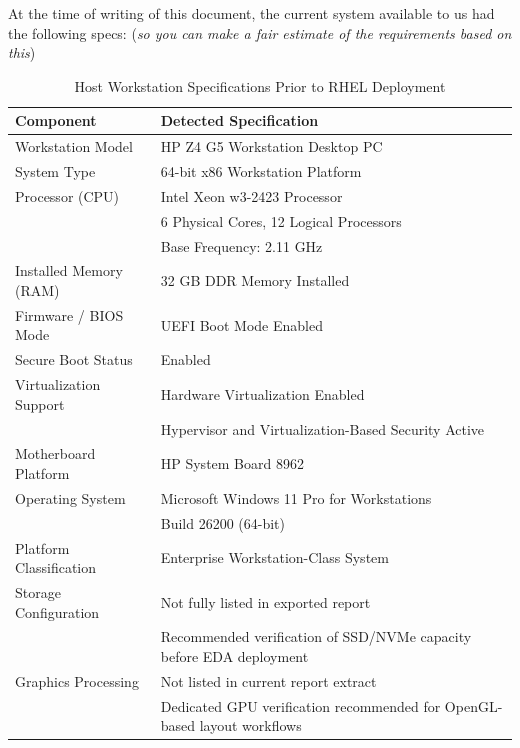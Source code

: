 \noindent At the time of writing of this document, the current system available to us had the following specs: (\textit{so you can make a fair estimate of the requirements based on this})

\begin{table}[H]
	\centering
	\renewcommand{\arraystretch}{1.4}

	\begin{tabular}{|p{5cm}|p{8cm}|}
		\hline
		\textbf{Component} & \textbf{Detected Specification} \\
		\hline
		Workstation Model &
		HP Z4 G5 Workstation Desktop PC \\
		\hline
		System Type &
		64-bit x86 Workstation Platform \\
		\hline
		Processor (CPU) &
		Intel Xeon w3-2423 Processor \\
		&
		6 Physical Cores, 12 Logical Processors \\
		&
		Base Frequency: 2.11 GHz \\
		\hline
		Installed Memory (RAM) &
		32 GB DDR Memory Installed \\
		\hline
		Firmware / BIOS Mode &
		UEFI Boot Mode Enabled \\
		\hline
		Secure Boot Status &
		Enabled \\
		\hline
		Virtualization Support &
		Hardware Virtualization Enabled \\
		&
		Hypervisor and Virtualization-Based Security Active \\
		\hline
		Motherboard Platform &
		HP System Board 8962 \\
		\hline
		Operating System &
		Microsoft Windows 11 Pro for Workstations \\
		&
		Build 26200 (64-bit) \\
		\hline
		Platform Classification &
		Enterprise Workstation-Class System \\
		\hline
		Storage Configuration &
		Not fully listed in exported report \\
		&
		Recommended verification of SSD/NVMe capacity before EDA deployment \\
		\hline
		Graphics Processing &
		Not listed in current report extract \\
		&
		Dedicated GPU verification recommended for OpenGL-based layout workflows \\
		\hline
	\end{tabular}
	\caption{Host Workstation Specifications Prior to RHEL Deployment}
\end{table}

